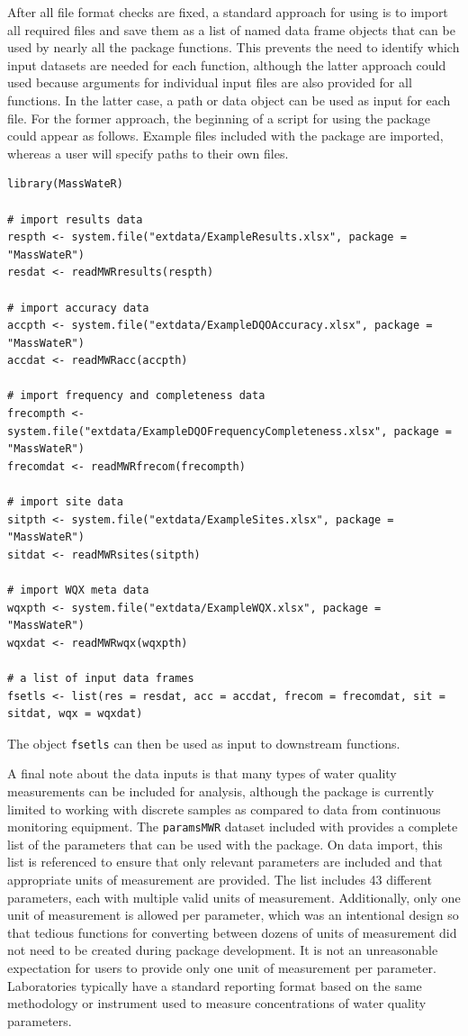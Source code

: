 After all file format checks are fixed, a standard approach for using  is to import all required files and save them as a list of named data frame objects that can be used by nearly all the package functions. This prevents the need to identify which input datasets are needed for each function, although the latter approach could used because arguments for individual input files are also provided for all functions. In the latter case, a path or data object can be used as input for each file. For the former approach, the beginning of a script for using the package could appear as follows. Example files included with the package are imported, whereas a user will specify paths to their own files.

\begin{verbatim}
library(MassWateR)

# import results data
respth <- system.file("extdata/ExampleResults.xlsx", package = "MassWateR")
resdat <- readMWRresults(respth)

# import accuracy data
accpth <- system.file("extdata/ExampleDQOAccuracy.xlsx", package = "MassWateR")
accdat <- readMWRacc(accpth)

# import frequency and completeness data
frecompth <- system.file("extdata/ExampleDQOFrequencyCompleteness.xlsx", package = "MassWateR")
frecomdat <- readMWRfrecom(frecompth)

# import site data
sitpth <- system.file("extdata/ExampleSites.xlsx", package = "MassWateR")
sitdat <- readMWRsites(sitpth)

# import WQX meta data
wqxpth <- system.file("extdata/ExampleWQX.xlsx", package = "MassWateR")
wqxdat <- readMWRwqx(wqxpth)

# a list of input data frames
fsetls <- list(res = resdat, acc = accdat, frecom = frecomdat, sit = sitdat, wqx = wqxdat)
\end{verbatim}

The object \texttt{fsetls} can then be used as input to downstream functions.

A final note about the data inputs is that many types of water quality measurements can be included for analysis, although the package is currently limited to working with discrete samples as compared to data from continuous monitoring equipment. The \texttt{paramsMWR} dataset included with  provides a complete list of the parameters that can be used with the package. On data import, this list is referenced to ensure that only relevant parameters are included and that appropriate units of measurement are provided. The list includes 43 different parameters, each with multiple valid units of measurement. Additionally, only one unit of measurement is allowed per parameter, which was an intentional design so that tedious functions for converting between dozens of units of measurement did not need to be created during package development. It is not an unreasonable expectation for users to provide only one unit of measurement per parameter. Laboratories typically have a standard reporting format based on the same methodology or instrument used to measure concentrations of water quality parameters.

